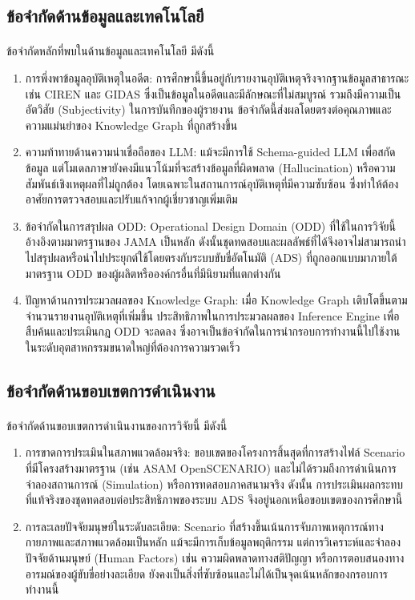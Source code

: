 \subsection{ข้อจำกัดด้านข้อมูลและเทคโนโลยี}\label{subsec:data-tech-limitations}
\paragraph{} ข้อจำกัดหลักที่พบในด้านข้อมูลและเทคโนโลยี มีดังนี้
\begin{enumerate}[label=\arabic*.)]
    \item การพึ่งพาข้อมูลอุบัติเหตุในอดีต: การศึกษานี้ขึ้นอยู่กับรายงานอุบัติเหตุจริงจากฐานข้อมูลสาธารณะ เช่น CIREN และ GIDAS ซึ่งเป็นข้อมูลในอดีตและมีลักษณะที่ไม่สมบูรณ์ รวมถึงมีความเป็นอัตวิสัย (Subjectivity) ในการบันทึกของผู้รายงาน ข้อจำกัดนี้ส่งผลโดยตรงต่อคุณภาพและความแม่นยำของ Knowledge Graph ที่ถูกสร้างขึ้น
    \item ความท้าทายด้านความน่าเชื่อถือของ LLM: แม้จะมีการใช้ Schema-guided LLM เพื่อสกัดข้อมูล แต่โมเดลภาษายังคงมีแนวโน้มที่จะสร้างข้อมูลที่ผิดพลาด (Hallucination) หรือความสัมพันธ์เชิงเหตุผลที่ไม่ถูกต้อง โดยเฉพาะในสถานการณ์อุบัติเหตุที่มีความซับซ้อน ซึ่งทำให้ต้องอาศัยการตรวจสอบและปรับแก้จากผู้เชี่ยวชาญเพิ่มเติม
    \item ข้อจำกัดในการสรุปผล ODD: Operational Design Domain (ODD) ที่ใช้ในการวิจัยนี้อ้างอิงตามมาตรฐานของ JAMA เป็นหลัก ดังนั้นชุดทดสอบและผลลัพธ์ที่ได้จึงอาจไม่สามารถนำไปสรุปผลหรือนำไปประยุกต์ใช้โดยตรงกับระบบขับขี่อัตโนมัติ (ADS) ที่ถูกออกแบบมาภายใต้มาตรฐาน ODD ของผู้ผลิตหรือองค์กรอื่นที่มีนิยามที่แตกต่างกัน
    \item ปัญหาด้านการประมวลผลของ Knowledge Graph: เมื่อ Knowledge Graph เติบโตขึ้นตามจำนวนรายงานอุบัติเหตุที่เพิ่มขึ้น ประสิทธิภาพในการประมวลผลของ Inference Engine เพื่อสืบค้นและประเมินกฎ ODD จะลดลง ซึ่งอาจเป็นข้อจำกัดในการนำกรอบการทำงานนี้ไปใช้งานในระดับอุตสาหกรรมขนาดใหญ่ที่ต้องการความรวดเร็ว
\end{enumerate}

\subsection{ข้อจำกัดด้านขอบเขตการดำเนินงาน}\label{subsec:scope-limitations}
\paragraph{} ข้อจำกัดด้านขอบเขตการดำเนินงานของการวิจัยนี้ มีดังนี้
\begin{enumerate}[label=\arabic*.)]
    \item การขาดการประเมินในสภาพแวดล้อมจริง: ขอบเขตของโครงการสิ้นสุดที่การสร้างไฟล์ Scenario ที่มีโครงสร้างมาตรฐาน (เช่น ASAM OpenSCENARIO) และไม่ได้รวมถึงการดำเนินการจำลองสถานการณ์ (Simulation) หรือการทดสอบภาคสนามจริง ดังนั้น การประเมินผลกระทบที่แท้จริงของชุดทดสอบต่อประสิทธิภาพของระบบ ADS จึงอยู่นอกเหนือขอบเขตของการศึกษานี้
    \item การละเลยปัจจัยมนุษย์ในระดับละเอียด: Scenario ที่สร้างขึ้นเน้นการจับภาพเหตุการณ์ทางกายภาพและสภาพแวดล้อมเป็นหลัก แม้จะมีการเก็บข้อมูลพฤติกรรม แต่การวิเคราะห์และจำลองปัจจัยด้านมนุษย์ (Human Factors) เช่น ความผิดพลาดทางสติปัญญา หรือการตอบสนองทางอารมณ์ของผู้ขับขี่อย่างละเอียด ยังคงเป็นสิ่งที่ซับซ้อนและไม่ได้เป็นจุดเน้นหลักของกรอบการทำงานนี้
\end{enumerate}